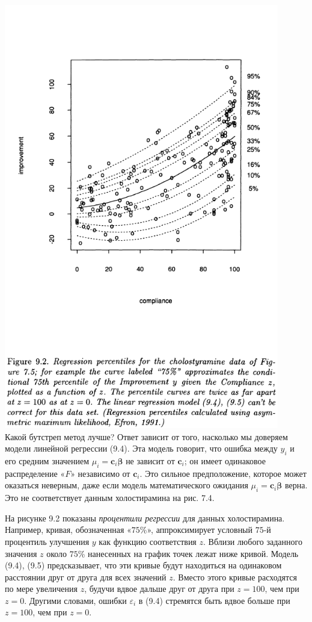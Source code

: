 \documentclass{report}
\begin{document}
\noindent\includegraphics[width=12cm]{fig92}\\

Какой бутстреп метод лучше? Ответ зависит от того, насколько мы доверяем модели линейной регрессии (9.4). Эта модель говорит, что ошибка между $y_i$ и его средним значением $\mu_i = \textbf{c}_i \bm{\beta}$ не зависит от $\textbf{c}_i$; он имеет одинаковое распределение «$F$» независимо от $\textbf{c}_i$. Это сильное предположение, которое может оказаться неверным, даже если модель математического ожидания $\mu_i = \textbf{c}_i \bm{\beta}$ верна. Это не соответствует данным холостирамина на рис. 7.4.

На рисунке 9.2 показаны \textit{процентили регрессии} для данных холостирамина. Например, кривая, обозначенная «$75$\%», аппроксимирует условный $75$-й процентиль улучшения $y$ как функцию соответствия $z$. Вблизи любого заданного значения $z$ около $75$\% нанесенных на график точек лежат ниже кривой. Модель (9.4), (9.5) предсказывает, что эти кривые будут находиться на одинаковом расстоянии друг от друга для всех значений $z$. Вместо этого кривые расходятся по мере увеличения $z$, будучи вдвое дальше друг от друга при $z = 100$, чем при $z = 0$. Другими словами, ошибки $\varepsilon_i$ в (9.4) стремятся быть вдвое больше при $z = 100$, чем при $z = 0$.
\end{document}
